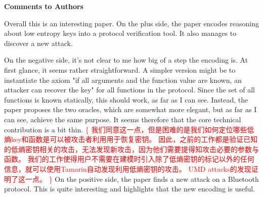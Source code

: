 \documentclass{article}
\newcommand{\response}[1]{\textcolor{red}{\{#1\}}}
\begin{document}
\rule{0pt}{8pt}

\noindent\textbf{Comments to Authors}

Overall this is an interesting paper. 
On the plus side, the paper encodes reasoning about low entropy keys into a protocol verification tool. 
It also manages to discover a new attack.

On the negative side, it's not clear to me how big of a step the encoding is. 
At first glance, it seems rather straightforward. 
A simpler version might be to instantiate the axiom "if all arguments and the function value are known, an attacker can recover the key" for all functions in the protocol. 
Since the set of all functions is known statically, this should work, as far as I can see.
Instead, the paper proposes the two oracles, which are somewhat more elegant, but as far as I can see, achieve the same purpose. 
It seems therefore that the core technical contribution is a bit thin. 
\response{
    我们同意这一点，但是困难的是我们如何定位哪些低熵key和函数是可以被攻击者利用用于恢复密钥。
    因此，之前的工作都是验证已知的低熵密钥相关的攻击，无法发现新攻击，因为他们需要提得知攻击必要的参数与函数。
    我们的工作使得用户不需要在建模时引入除了低熵密钥的标记以外的任何信息，就可以使用Tamarin自动发现利用低熵密钥的攻击。
    UMD attacks的发现证明了这一点。
}
On the positive side, the paper finds a new attack on a Bluetooth protocol. 
This is quite interesting and highlights that the new encoding is useful.
\end{document}
